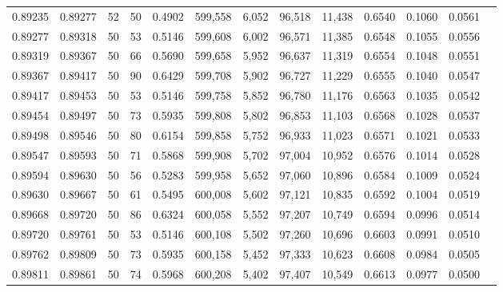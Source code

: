 \begin{tabular}{rrrrrrrrrrrrr}
0.89235 & 0.89277 &    52 &  50 &                                     0.4902 & 599,558 &   6,052 &  96,518 &  11,438 & 0.6540 & 0.1060 & 0.0561 \\
0.89277 & 0.89318 &    50 &  53 &                                     0.5146 & 599,608 &   6,002 &  96,571 &  11,385 & 0.6548 & 0.1055 & 0.0556 \\
0.89319 & 0.89367 &    50 &  66 &                                     0.5690 & 599,658 &   5,952 &  96,637 &  11,319 & 0.6554 & 0.1048 & 0.0551 \\
0.89367 & 0.89417 &    50 &  90 &                                     0.6429 & 599,708 &   5,902 &  96,727 &  11,229 & 0.6555 & 0.1040 & 0.0547 \\
0.89417 & 0.89453 &    50 &  53 &                                     0.5146 & 599,758 &   5,852 &  96,780 &  11,176 & 0.6563 & 0.1035 & 0.0542 \\
0.89454 & 0.89497 &    50 &  73 &                                     0.5935 & 599,808 &   5,802 &  96,853 &  11,103 & 0.6568 & 0.1028 & 0.0537 \\
0.89498 & 0.89546 &    50 &  80 &                                     0.6154 & 599,858 &   5,752 &  96,933 &  11,023 & 0.6571 & 0.1021 & 0.0533 \\
0.89547 & 0.89593 &    50 &  71 &                                     0.5868 & 599,908 &   5,702 &  97,004 &  10,952 & 0.6576 & 0.1014 & 0.0528 \\
0.89594 & 0.89630 &    50 &  56 &                                     0.5283 & 599,958 &   5,652 &  97,060 &  10,896 & 0.6584 & 0.1009 & 0.0524 \\
0.89630 & 0.89667 &    50 &  61 &                                     0.5495 & 600,008 &   5,602 &  97,121 &  10,835 & 0.6592 & 0.1004 & 0.0519 \\
0.89668 & 0.89720 &    50 &  86 &                                     0.6324 & 600,058 &   5,552 &  97,207 &  10,749 & 0.6594 & 0.0996 & 0.0514 \\
0.89720 & 0.89761 &    50 &  53 &                                     0.5146 & 600,108 &   5,502 &  97,260 &  10,696 & 0.6603 & 0.0991 & 0.0510 \\
0.89762 & 0.89809 &    50 &  73 &                                     0.5935 & 600,158 &   5,452 &  97,333 &  10,623 & 0.6608 & 0.0984 & 0.0505 \\
0.89811 & 0.89861 &    50 &  74 &                                     0.5968 & 600,208 &   5,402 &  97,407 &  10,549 & 0.6613 & 0.0977 & 0.0500 \\

\end{tabular}
